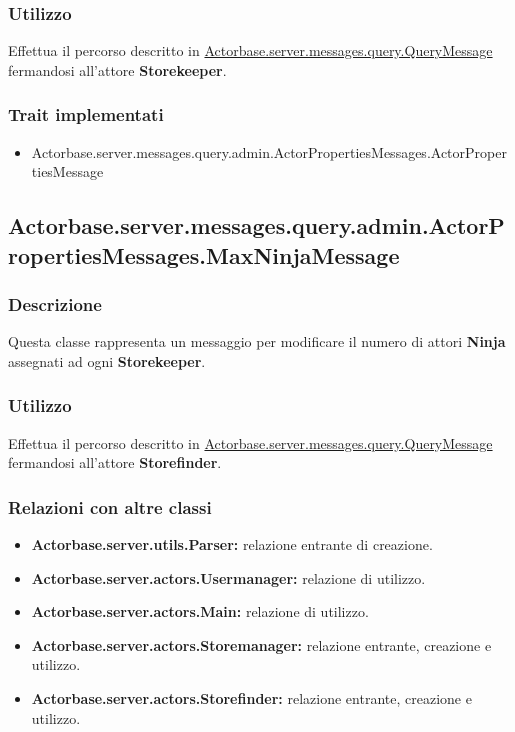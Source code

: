 \documentclass[a4paper]{article}
\begin{document}
			\subsubsection{Utilizzo}
				Effettua il percorso descritto in \hyperref[QueryMessage]{Actorbase.server.messages.query.QueryMessage} fermandosi all'attore 
				\textbf{Storekeeper}.
				
			\subsubsection{Trait implementati}
				\begin{itemize}
					\item Actorbase.server.messages.query.admin.ActorPropertiesMessages.ActorPropertiesMessage
				\end{itemize}
		
		\subsection{Actorbase.server.messages.query.admin.ActorPropertiesMessages.MaxNinjaMessage}
			\subsubsection{Descrizione}
				Questa classe rappresenta un messaggio per modificare il numero di attori \textbf{Ninja} assegnati ad ogni \textbf{Storekeeper}.
				
			\subsubsection{Utilizzo}
				Effettua il percorso descritto in \hyperref[QueryMessage]{Actorbase.server.messages.query.QueryMessage} fermandosi all'attore 
				\textbf{Storefinder}.
				
			\subsubsection{Relazioni con altre classi}
				\begin{itemize}
					\item \textbf{Actorbase.server.utils.Parser:} relazione entrante di creazione.
					\item \textbf{Actorbase.server.actors.Usermanager:} relazione di utilizzo.
					\item \textbf{Actorbase.server.actors.Main:} relazione di utilizzo.
					\item \textbf{Actorbase.server.actors.Storemanager:} relazione entrante, creazione e utilizzo.
					\item \textbf{Actorbase.server.actors.Storefinder:} relazione entrante, creazione e utilizzo.
				\end{itemize}
\end{document}
